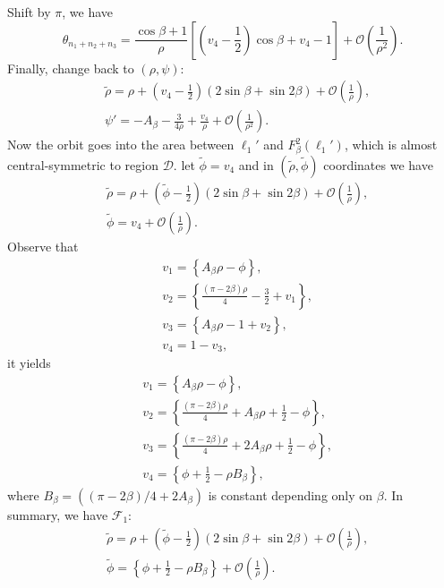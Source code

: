 \documentclass{article}
\numberwithin{figure}{section}
\numberwithin{equation}{section}
\theoremstyle{remark}
\theoremstyle{definition}
\begin{document}
Shift by $\pi$, we have
\begin{equation}
	\theta_{n_1+n_2+n_3}=\frac{\cos\beta+1}{\rho}\left[\left(v_4-\frac{1}{2}\right)\cos\beta+v_4-1\right]+\mathcal{O}\left(\frac{1}{\rho^2}\right).
\end{equation}
Finally, change back to $(\rho,\psi)$:
\begin{equation}
	\begin{split}
		&\widetilde{\rho}=\rho+\left(v_4-\frac{1}{2}\right)\left(2\sin\beta+\sin2\beta\right)+\mathcal{O}\left(\frac{1}{\rho}\right),\\
		&\psi'=-A_\beta-\frac{3}{4\rho}+\frac{v_4}{\rho}+\mathcal{O}\left(\frac{1}{\rho^2}\right).
	\end{split}
\end{equation}
Now the orbit goes into the area between $\ell_1'$ and $F_\beta^2(\ell_1')$, which is almost central-symmetric to region $\mathcal{D}$. let $\widetilde{\phi}=v_4$ and in $(\widetilde{\rho},\widetilde{\phi})$ coordinates we have
\begin{equation}
	\begin{split}
		&\widetilde{\rho}=\rho+\left(\widetilde{\phi}-\frac{1}{2}\right)\left(2\sin\beta+\sin2\beta\right)+\mathcal{O}\left(\frac{1}{\rho}\right),\\
		&\widetilde{\phi}=v_4+\mathcal{O}\left(\frac{1}{\rho}\right).
	\end{split}
\end{equation}
Observe that 
\begin{align*}
	&v_1=\left\{A_\beta\rho-\phi\right\},\\
	&v_2=\left\{\frac{(\pi-2\beta)\rho}{4}-\frac{3}{2}+v_1\right\},\\
	&v_3=\left\{A_\beta\rho-1+v_2\right\},\\
	&v_4=1-v_3,
\end{align*}
it yields 
\begin{align*}
	&v_1=\left\{A_\beta\rho-\phi\right\},\\
	&v_2=\left\{\frac{(\pi-2\beta)\rho}{4}+A_\beta\rho+\frac{1}{2}-\phi\right\},\\
	&v_3=\left\{\frac{(\pi-2\beta)\rho}{4}+2A_\beta\rho+\frac{1}{2}-\phi\right\},\\
	&v_4=\left\{\phi+\frac{1}{2}-\rho B_\beta\right\},
\end{align*}
where $B_\beta=\left((\pi-2\beta)/4+2A_\beta\right)$ is constant depending only on $\beta$.
In summary, we have $\mathcal{F}_1$:
\begin{equation}
	\begin{split}
		&\widetilde{\rho}=\rho+\left(\widetilde{\phi}-\frac{1}{2}\right)\left(2\sin\beta+\sin2\beta\right)+\mathcal{O}\left(\frac{1}{\rho}\right),\\
		&\widetilde{\phi}=\left\{\phi+\frac{1}{2}-\rho B_\beta\right\}+\mathcal{O}\left(\frac{1}{\rho}\right).
	\end{split}
\end{equation}
\end{document}
